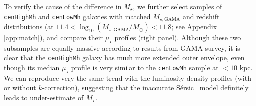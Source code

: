 \documentclass[a4paper,fleqn,usenatbib]{mnras}
\def\ser{{S\'{e}rsic\ }}
\def\rbcg{\texttt{cenHighMh}}
\def\nbcg{\texttt{cenLowMh}}
\def\mstar{{$M_{\star}$}}
\def\mgama{{$M_{\star,\mathrm{GAMA}}$}}
\def\logmgama{{$\log_{10} (M_{\star,\mathrm{GAMA}}/M_{\odot})$}}
\def\mden{{$\mu_{\star}$}}
\begin{document}
    To verify the cause of the difference in \mstar{}, we further select samples 
    of \rbcg{} and \nbcg{} galaxies with matched \mgama{} and redshift 
    distributions (at $11.4 <$\logmgama{}$<11.8$; see Appendix \ref{app:match}), 
    and compare their \mden{} profiles (right panel). 
    Although these two subsamples are equally massive according to results from 
    GAMA survey, it is clear that the \rbcg{} galaxy has much more extended 
    outer envelope, even though its median \mden{} profile is very similar 
    to the \nbcg{} sample at $< 10$ kpc. 
    We can reproduce very the same trend with the luminosity density profiles 
    (with or without $k$-correction), suggesting that the inaccurate \ser{} 
    model definitely leads to under-estimate of \mstar{}.  
 


\bsp
\label{lastpage}
\end{document}
